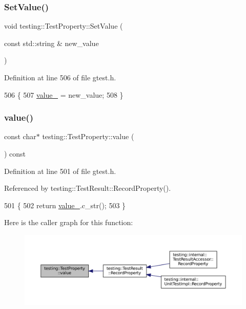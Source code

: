 \subsubsection{\texorpdfstring{Set\+Value()}{SetValue()}}
{\footnotesize\ttfamily void testing\+::\+Test\+Property\+::\+Set\+Value (\begin{DoxyParamCaption}\item[{const std\+::string \&}]{new\+\_\+value }\end{DoxyParamCaption})\hspace{0.3cm}{\ttfamily [inline]}}



Definition at line 506 of file gtest.\+h.


\begin{DoxyCode}
506                                             \{
507     \hyperlink{classtesting_1_1TestProperty_a204e3793205a1e61412fc34be1913c01}{value\_} = new\_value;
508   \}
\end{DoxyCode}
\mbox{\label{classtesting_1_1TestProperty_ad423a07af33c88b0c9ed33ee74815a63}} 
\subsubsection{\texorpdfstring{value()}{value()}}
{\footnotesize\ttfamily const char$\ast$ testing\+::\+Test\+Property\+::value (\begin{DoxyParamCaption}{ }\end{DoxyParamCaption}) const\hspace{0.3cm}{\ttfamily [inline]}}



Definition at line 501 of file gtest.\+h.



Referenced by testing\+::\+Test\+Result\+::\+Record\+Property().


\begin{DoxyCode}
501                             \{
502     \textcolor{keywordflow}{return} \hyperlink{classtesting_1_1TestProperty_a204e3793205a1e61412fc34be1913c01}{value\_}.c\_str();
503   \}
\end{DoxyCode}
Here is the caller graph for this function\+:
\nopagebreak
\begin{figure}[H]
\begin{center}
\leavevmode
\includegraphics[width=350pt]{classtesting_1_1TestProperty_ad423a07af33c88b0c9ed33ee74815a63_icgraph}
\end{center}
\end{figure}



